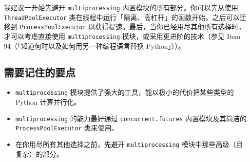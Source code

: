 我建议一开始先避开 \texttt{multiprocessing} 内置模块的所有部分。你可以先从使用 \texttt{ThreadPoolExecutor} 类在线程中运行「隔离、高杠杆」的函数开始。之后可以迁移到 \texttt{ProcessPoolExecutor} 以获得提速。最后，当你已经用尽其他所有选择时，才可以考虑直接使用 \texttt{multiprocessing} 模块，或采用更进阶的技术（参见 Item 94（「知道何时以及如何用另一种编程语言替换 Python」））。

\subsection{需要记住的要点}

\begin{itemize}
\item \texttt{multiprocessing} 模块提供了强大的工具，能以极小的代价把某些类型的 Python 计算并行化。
\item \texttt{multiprocessing} 的能力最好通过 \texttt{concurrent.futures} 内置模块及其简洁的 \texttt{ProcessPoolExecutor} 类来使用。
\item 在你用尽所有其他选择之前，先避开 \texttt{multiprocessing} 模块中那些高级（且复杂）的部分。
\end{itemize}
